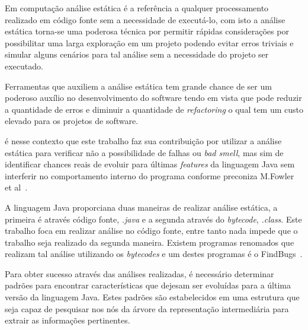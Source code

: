 Em computação análise estática é a referência a qualquer processamento realizado em código fonte sem a necessidade de executá-lo, com isto a análise estática torna-se uma poderosa técnica por permitir rápidas considerações por possibilitar uma larga exploração em um projeto podendo evitar erros triviais e simular alguns cenários para tal análise sem a necessidade do projeto ser executado.

Ferramentas que auxiliem a análise estática tem grande chance de ser um poderoso auxílio no desenvolvimento do software tendo em vista que pode reduzir a quantidade de erros e diminuir a quantidade de \textit{refactoring} o qual tem um custo elevado para os projetos de software.

é nesse contexto que este trabalho faz sua contribuição por utilizar a análise estática para verificar não a possibilidade de falhas ou \textit{bad smell}, mas sim de identificar chances reais de evoluir para últimas \textit{features} da linguagem Java sem interferir no comportamento interno do programa conforme preconiza M.Fowler et al~\cite{martinFowlerRafactoring}.

A linguagem Java proporciana duas maneiras de realizar análise estática, a primeira é através código fonte, \textit{.java} e a segunda através do \textit{bytecode}, \textit{.class}. Este trabalho foca em realizar análise no código fonte, entre tanto nada impede que o trabalho seja realizado da segunda maneira. Existem programas renomados que realizam tal análise utilizando os \textit{bytecodes} e um destes programas é o FindBugs~\cite{FindBugs}.


Para obter sucesso através das análises realizadas, é necessário determinar padrões para encontrar características que dejesam ser evoluídas para a última versão da linguagem Java. Estes padrões são estabelecidos em uma estrutura que seja capaz de pesquisar nos nós da árvore da representação intermediária para extrair as informações pertinentes.

